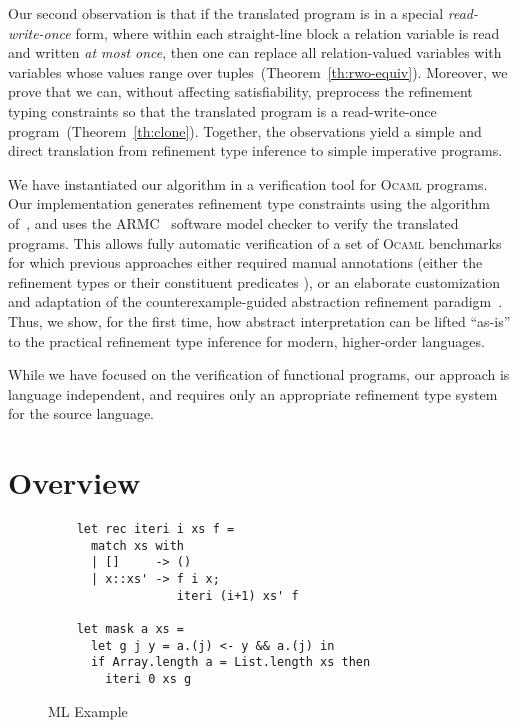 \documentclass[nocopyrightspace]{sigplanconf}
\newcommand\ML{\textsc{ML}\xspace}
\newcommand\ocaml{\textsc{Ocaml}\xspace}
\newcommand\ARMC{\textsc{ARMC}\xspace}
\begin{document}
Our second observation is that if the translated program is in a special 
\emph{read-write-once} form, where within each straight-line block
a relation variable is read and written \emph{at most once}, 
then one can replace all relation-valued variables with variables whose
values range over tuples~(Theorem~\ref{th:rwo-equiv}). 
Moreover, we prove that we can, without affecting satisfiability, 
preprocess the refinement typing constraints so that the translated program is 
a read-write-once program~(Theorem~\ref{th:clone}).
Together, the observations yield a simple and direct translation
from refinement type inference to simple imperative programs.




We have instantiated our algorithm in a verification tool for \ocaml programs.
Our implementation 
generates refinement type constraints using the algorithm of~\cite{LiquidPLDI08}, 
and uses the \ARMC~\cite{PADL07} software model checker to verify the translated programs. 
This allows fully automatic verification of a set of \ocaml benchmarks
for which previous approaches either required manual annotations
(either the refinement types \cite{XiPfenning99} or their constituent
predicates \cite{LiquidPLDI08}), or an elaborate customization and
adaptation of the counterexample-guided abstraction refinement
paradigm~\cite{TerauchiPOPL2010}.
Thus, we show, for the first time, how abstract interpretation can be
lifted ``as-is'' to the practical refinement type inference for
modern, higher-order languages.

While we have focused on the verification of 
functional programs, our approach is language independent, 
and requires only an appropriate refinement type system for the source
language. 




\section{Overview}

\begin{figure}[t]
\begin{small}
\begin{center}
\begin{verbatim}
    let rec iteri i xs f = 
      match xs with
      | []     -> ()
      | x::xs' -> f i x; 
                  iteri (i+1) xs' f

    let mask a xs = 
      let g j y = a.(j) <- y && a.(j) in
      if Array.length a = List.length xs then
        iteri 0 xs g
\end{verbatim}
\end{center}
\end{small}
\caption{\ML Example}
\label{ex:ml-abc}
\end{figure}
\end{document}
